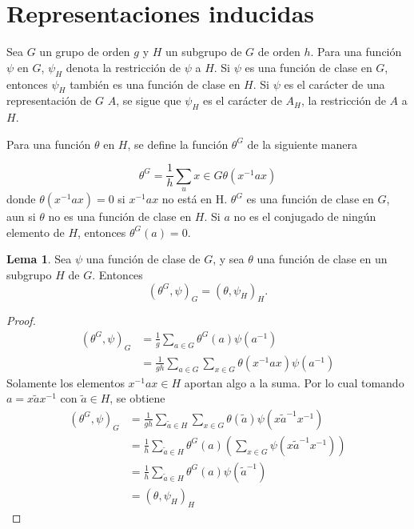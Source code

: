 \documentclass[12pt]{book}
\theoremstyle{definition}
\newtheorem{lemma}[theorem]{Lema}
\newcounter{in}
\begin{document}
\section{Representaciones inducidas}
\label{sec:ri}

Sea $G$ un grupo de orden $g$ y $H$ un subgrupo de $G$ de orden
$h$. Para una función $\psi$ en $G$, $\psi_{H}$ denota la restricción
de $\psi$ a $H$. Si $\psi$ es una función de clase en $G$, entonces
$\psi_{H}$ también es una función de clase en $H$. Si $\psi$ es el
carácter de una representación de $G$ $A$, se sigue que $\psi_{H}$ es
el carácter de $A_{H}$, la restricción de $A$ a $H$.

Para una función $\theta$ en $H$, se define la función $\theta^{G}$ de
la siguiente manera

\begin{equation}
  \label{eq:58}
  \theta^{G}=\frac{1}{h} \sum_ u{x \in G} \theta(x^{-1}ax)
\end{equation}
donde $\theta(x^{-1}ax)=0$ si $x^{-1}ax$ no está en H. $\theta^{G}$ es
una función de clase en $G$, aun si $\theta$ no es una función de
clase en $H$. Si $a$ no es el conjugado de ningún elemento de $H$,
entonces $\theta^{G}(a)=0$.

\begin{lemma}
  \label{l5_1}
  Sea $\psi$ una función de clase de $G$, y sea $\theta$ una función
  de clase en un subgrupo $H$ de $G$. Entonces
  \begin{equation*}
    (\theta^{G},\psi)_{G}= (\theta,\psi_{H})_{H} .
  \end{equation*}
\end{lemma} 

\begin{proof}
  \begin{equation}
    \label{eq:59}
    \begin{aligned}
      (\theta^{G},\psi)_{G} &= \frac{1}{g} \sum_{a \in G} \theta^{G}(a) \psi(a^{-1})\\
      &= \frac{1}{gh} \sum_{a \in G} \sum_{x \in G} \theta(x^{-1}ax) \psi(a^{-1})
    \end{aligned}
  \end{equation}  
  Solamente los elementos $x^{-1}ax \in H$ aportan algo a la suma. Por
  lo cual tomando $a=x \tilde{a} x^{-1}$ con $\tilde{a} \in H$, se
  obtiene
  \begin{equation}
    \label{eq:60}
    \begin{aligned}
      (\theta^{G},\psi)_{G} &= \frac{1}{gh} \sum_{\tilde{a} \in H} \sum_{x \in G} \theta(\tilde{a}) \psi(x \tilde{a}^{-1} x^{-1})\\
      &= \frac{1}{h} \sum_{\tilde{a} \in H} \theta^{G}(a) (\sum_{x \in G} \psi(x \tilde{a}^{-1}x^{-1})) \\
      &= \frac{1}{h} \sum_{\tilde{a} \in H} \theta^{G}(a) \psi(\tilde{a}^{-1}) \\
      &=  (\theta,\psi_{H})_{H}
    \end{aligned}
  \end{equation}
\end{proof}
\end{document}
